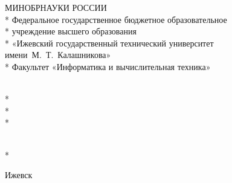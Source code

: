\begin{frame}

\newcommand{\mytitlefont}{\fontsize{12pt}{7.2}\selectfont}

\begin{center}
\mytitlefont
МИНОБРНАУКИ РОССИИ\\*
Федеральное государственное бюджетное образовательное\\*
учреждение высшего образования\\*
«Ижевский государственный технический университет имени~М.~Т.~Калашникова»\\*
Факультет «Информатика и вычислительная техника»
\end{center}

\mytitlefont
\begin{center}
\mytitlefont
\myfullname\\*
\titletext\\*
\titletype\\*
\end{center}

\myspeciality

\begin{flushleft}
    \mytitlefont
    \mylabel \hfill \myname\\*
    \vspace{1.5em}
\ifdefmacro{\myteacherdegree}{
    \myteacherlabel\\*
    \myteacherdegree \hfill \myteacher\\*
}{
    \myteacherlabel \hfill \myteacher\\*
}
\end{flushleft}

\vspace{\fill}

\begin{center}
    \mytitlefont
    Ижевск \myyear
\end{center}

\end{frame}

